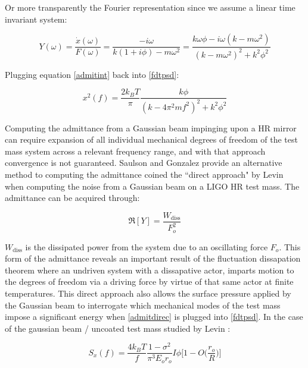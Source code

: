 \noindent Or more transparently the Fourier representation since we assume a linear time invariant system:

\begin{equation}\label{admitint}
Y(\omega) = \frac{\dot{x}(\omega)}{F(\omega)} = \frac{-i\omega}{k(1+i\phi) - m\omega^2} = \frac{k \omega \phi - i \omega (k - m \omega^2)}{(k-m\omega^2)^2 +k^2 \phi^2}
\end{equation}

\noindent Plugging equation \ref{admitint} back into \ref{fdtpsd}:

\begin{equation}
x^2 (f)  = \frac{2k_B T}{\pi}\frac{k\phi}{(k-4\pi^2 m f^2)^2 + k^2 \phi^2}
\end{equation}

\noindent Computing the admittance from a Gaussian beam impinging upon a HR mirror can require expansion of all individual mechanical degrees of freedom of the test mass system across a relevant frequency range, and with that approach convergence is not guaranteed. Saulson and Gonzalez provide an alternative method to computing the admittance coined the ``direct approach" by Levin when computing the noise from a Gaussian beam on a LIGO HR test mass. The admittance can be acquired through:

\begin{equation}\label{admitdirec}
\Re[Y] = \frac{W_\mathrm{diss}}{F_o^2}
\end{equation}

\noindent $W_\mathrm{diss}$ is the dissipated power from the system due to an oscillating force $F_o$. This form of the admittance reveals an important result of the fluctuation dissapation theorem where an undriven system with a dissapative actor, imparts motion to the degrees of freedom via a driving force by virtue of that same actor at finite temperatures. This direct approach also allows the surface pressure applied by the Gaussian beam to interrogate which mechanical modes of the test mass impose a significant energy when \ref{admitdirec} is plugged into \ref{fdtpsd}. In the case of the gaussian beam / uncoated test mass studied by Levin \cite{levin:1998}:

\begin{equation}
S_x(f) = \frac{4 k_B T}{f} \frac{1-\sigma^2}{\pi^3 E_o r_o} I\phi \bigg[1- O\bigg( \frac{r_o}{R} \bigg)\bigg]
\end{equation}


